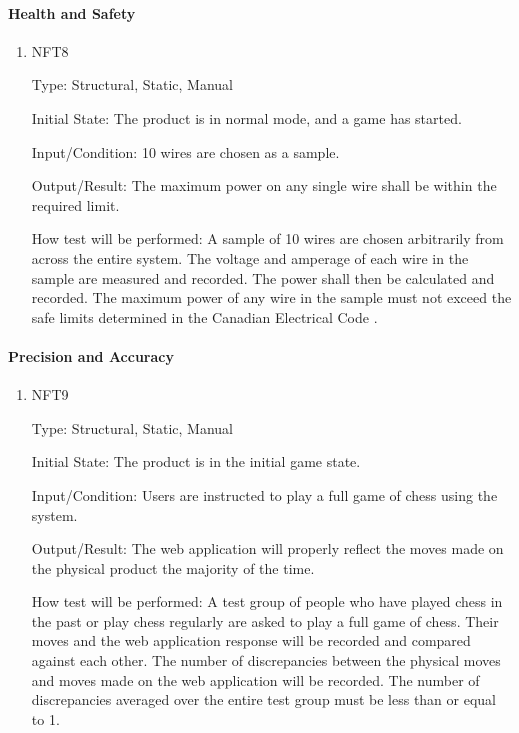 \documentclass[12pt, titlepage]{article}
\begin{document}
\paragraph{Health and Safety}
\begin{enumerate}
    \item{NFT8}

        Type: Structural, Static, Manual
                            
        Initial State: The product is in normal mode, and a game has started.
                            
        Input/Condition: 10 wires are chosen as a sample.
                            
        Output/Result: The maximum power on any single wire shall be within the required limit.
                            
        How test will be performed: A sample of 10 wires are chosen arbitrarily from across the entire system. The voltage and amperage of 
            each wire in the sample are measured and recorded. The power shall then be calculated and recorded. The maximum power of any wire
            in the sample must not exceed the safe limits determined in the Canadian Electrical Code \cite{CanadianElectricalCode2021}.
\end{enumerate}

\paragraph{Precision and Accuracy}
\begin{enumerate}
    \item{NFT9}

        Type: Structural, Static, Manual
                            
        Initial State: The product is in the initial game state.
                            
        Input/Condition: Users are instructed to play a full game of chess using the \progname{} system.
                            
        Output/Result: The web application will properly reflect the moves made on the physical product the majority of the time.
                            
        How test will be performed: A test group of people who have played chess in the past or play chess regularly are asked to play a full game of chess. 
            Their moves and the web application response will be recorded and compared against each other. The number of discrepancies between the physical 
            moves and moves made on the web application will be recorded. The number of discrepancies averaged over the entire test group must be less than 
            or equal to 1.
\end{enumerate}
\end{document}
